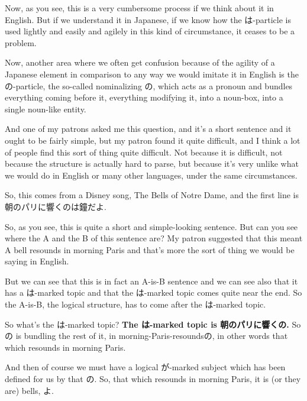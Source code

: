 Now, as you see, this is a very cumbersome process if we think about it in English. But if we understand it in Japanese, if we know how the は-particle is used lightly and easily and agilely in this kind of circumstance, it ceases to be a problem.

\stopsectionlevel

\startsectionlevel[title={Particle の},reference={particle-の}]

Now, another area where we often get confusion because of the agility of a Japanese element in comparison to any way we would imitate it in English is the の-particle, the so-called nominalizing の, which acts as a pronoun and bundles everything coming before it, everything modifying it, into a noun-box, into a single noun-like entity.

And one of my patrons asked me this question, and it's a short sentence and it ought to be fairly simple, but my patron found it quite difficult, and I think a lot of people find this sort of thing quite difficult. Not because it is difficult, not because the structure is actually hard to parse, but because it's very unlike what we would do in English or many other languages, under the same circumstances.

So, this comes from a Disney song, The Bells of Notre Dame, and the first line is 朝のパリに響くのは鐘だよ.

{}

So, as you see, this is quite a short and simple-looking sentence. But can you see where the A and the B of this sentence are? My patron suggested that this meant A bell resounds in morning Paris and that's more the sort of thing we would be saying in English.

But we can see that this is in fact an A-is-B sentence and we can see also that it has a は-marked topic and that the は-marked topic comes quite near the end. So the A-is-B, the logical structure, has to come after the は-marked topic.

So what's the は-marked topic? {\bf The は-marked topic is 朝のパリに響くの.} So の is bundling the rest of it, in morning-Paris-resoundsの, in other words that which resounds in morning Paris.

And then of course we must have a logical が-marked subject which has been defined for us by that の. So, that which resounds in morning Paris, it is (or they are) bells, よ.

{}

